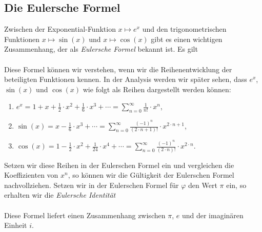 \subsection{Die Eulersche Formel}
Zwischen der Exponential-Funktion $x \mapsto e^x$ und den trigonometrischen Funktionen 
$x \mapsto \sin(x)$ und $x \mapsto \cos(x)$ gibt es einen wichtigen Zusammenhang, der als
\emph{Eulersche Formel} bekannt ist.  Es gilt
\\[0.2cm]
\hspace*{1.3cm}
\\[0.2cm]
Diese Formel können wir verstehen, wenn wir die Reihenentwicklung der beteiligten Funktionen kennen.
In der Analysis werden wir später sehen, dass $e^x$, $\sin(x)$ und $\cos(x)$ wie folgt als Reihen
dargestellt werden können:
\begin{enumerate}
\item $\displaystyle e^x = 1 + x + \frac{1}{2} \cdot x^2 + \frac{1}{6} \cdot x^3 + \cdots = \sum\limits_{n=0}^\infty \frac{1}{n!} \cdot x^n$,
\item $\displaystyle \sin(x) = x - \frac{1}{6} \cdot x^3 + \cdots = \sum\limits_{n=0}^\infty \frac{(-1)^{n}}{(2 \cdot n + 1)!} \cdot x^{2 \cdot n + 1}$,
\item $\displaystyle \cos(x) = 1 -  \frac{1}{2} \cdot x^2 +  \frac{1}{24} \cdot x^4 + \cdots = \sum\limits_{n=0}^\infty  \frac{(-1)^{n}}{(2 \cdot n)!} \cdot x^{2 \cdot n}$.
\end{enumerate}
Setzen wir diese Reihen in der Eulerschen Formel ein und vergleichen die Koeffizienten von $x^n$, so
können wir die Gültigkeit der Eulerschen Formel nachvollziehen.  Setzen wir in der Eulerschen Formel
für $\varphi$ den Wert $\pi$ ein, so erhalten wir die \emph{Eulersche Identität}
\\[0.2cm]
\hspace*{1.3cm}
\\[0.2cm]
Diese Formel liefert einen Zusammenhang zwischen $\pi$, $e$ und der imaginären Einheit $i$.

